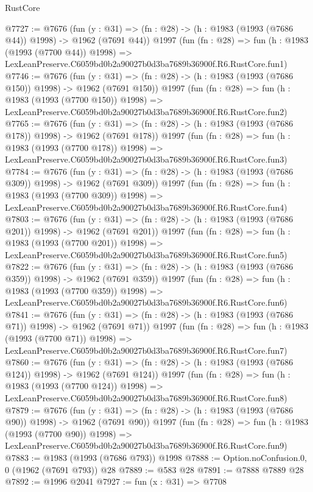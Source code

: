 \begin{lexlean}{RustCore}
\begin{coremodule}
@7727 := @7676
    (fun (y : @31) => (fn : @28) -> (h : @1983 (@1993 (@7686 @44)) @1998) -> @1962 (@7691 @44))
    @1997
    (fun (fn : @28) =>
    fun (h : @1983 (@1993 (@7700 @44)) @1998) =>
    LexLeanPreserve.C6059bd0b2a90027b0d3ba7689b36900f.R6.RustCore.fun1)
@7746 := @7676
    (fun (y : @31) => (fn : @28) -> (h : @1983 (@1993 (@7686 @150)) @1998) -> @1962 (@7691 @150))
    @1997
    (fun (fn : @28) =>
    fun (h : @1983 (@1993 (@7700 @150)) @1998) =>
    LexLeanPreserve.C6059bd0b2a90027b0d3ba7689b36900f.R6.RustCore.fun2)
@7765 := @7676
    (fun (y : @31) => (fn : @28) -> (h : @1983 (@1993 (@7686 @178)) @1998) -> @1962 (@7691 @178))
    @1997
    (fun (fn : @28) =>
    fun (h : @1983 (@1993 (@7700 @178)) @1998) =>
    LexLeanPreserve.C6059bd0b2a90027b0d3ba7689b36900f.R6.RustCore.fun3)
@7784 := @7676
    (fun (y : @31) => (fn : @28) -> (h : @1983 (@1993 (@7686 @309)) @1998) -> @1962 (@7691 @309))
    @1997
    (fun (fn : @28) =>
    fun (h : @1983 (@1993 (@7700 @309)) @1998) =>
    LexLeanPreserve.C6059bd0b2a90027b0d3ba7689b36900f.R6.RustCore.fun4)
@7803 := @7676
    (fun (y : @31) => (fn : @28) -> (h : @1983 (@1993 (@7686 @201)) @1998) -> @1962 (@7691 @201))
    @1997
    (fun (fn : @28) =>
    fun (h : @1983 (@1993 (@7700 @201)) @1998) =>
    LexLeanPreserve.C6059bd0b2a90027b0d3ba7689b36900f.R6.RustCore.fun5)
@7822 := @7676
    (fun (y : @31) => (fn : @28) -> (h : @1983 (@1993 (@7686 @359)) @1998) -> @1962 (@7691 @359))
    @1997
    (fun (fn : @28) =>
    fun (h : @1983 (@1993 (@7700 @359)) @1998) =>
    LexLeanPreserve.C6059bd0b2a90027b0d3ba7689b36900f.R6.RustCore.fun6)
@7841 := @7676
    (fun (y : @31) => (fn : @28) -> (h : @1983 (@1993 (@7686 @71)) @1998) -> @1962 (@7691 @71))
    @1997
    (fun (fn : @28) =>
    fun (h : @1983 (@1993 (@7700 @71)) @1998) =>
    LexLeanPreserve.C6059bd0b2a90027b0d3ba7689b36900f.R6.RustCore.fun7)
@7860 := @7676
    (fun (y : @31) => (fn : @28) -> (h : @1983 (@1993 (@7686 @124)) @1998) -> @1962 (@7691 @124))
    @1997
    (fun (fn : @28) =>
    fun (h : @1983 (@1993 (@7700 @124)) @1998) =>
    LexLeanPreserve.C6059bd0b2a90027b0d3ba7689b36900f.R6.RustCore.fun8)
@7879 := @7676
    (fun (y : @31) => (fn : @28) -> (h : @1983 (@1993 (@7686 @90)) @1998) -> @1962 (@7691 @90))
    @1997
    (fun (fn : @28) =>
    fun (h : @1983 (@1993 (@7700 @90)) @1998) =>
    LexLeanPreserve.C6059bd0b2a90027b0d3ba7689b36900f.R6.RustCore.fun9)
@7883 := @1983 (@1993 (@7686 @793)) @1998
@7888 := Option.noConfusion.{0, 0} (@1962 (@7691 @793)) @28
@7889 := @583 @28
@7891 := @7888 @7889 @28
@7892 := @1996 @2041
@7927 := fun (x : @31) =>
  @7708

\end{coremodule}
\end{lexlean}
